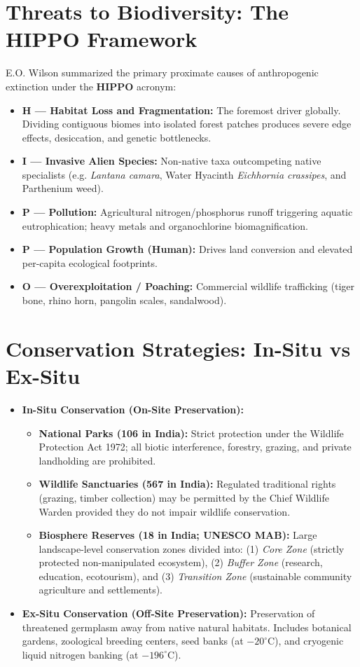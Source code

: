 \section{Threats to Biodiversity: The HIPPO Framework}
E.O. Wilson summarized the primary proximate causes of anthropogenic extinction under the \textbf{HIPPO} acronym:
\begin{itemize}[leftmargin=1.5em]
    \item \textbf{H --- Habitat Loss and Fragmentation:} The foremost driver globally. Dividing contiguous biomes into isolated forest patches produces severe edge effects, desiccation, and genetic bottlenecks.
    \item \textbf{I --- Invasive Alien Species:} Non-native taxa outcompeting native specialists (e.g. \textit{Lantana camara}, Water Hyacinth \textit{Eichhornia crassipes}, and Parthenium weed).
    \item \textbf{P --- Pollution:} Agricultural nitrogen/phosphorus runoff triggering aquatic eutrophication; heavy metals and organochlorine biomagnification.
    \item \textbf{P --- Population Growth (Human):} Drives land conversion and elevated per-capita ecological footprints.
    \item \textbf{O --- Overexploitation / Poaching:} Commercial wildlife trafficking (tiger bone, rhino horn, pangolin scales, sandalwood).
\end{itemize}

\section{Conservation Strategies: In-Situ vs Ex-Situ}
\begin{itemize}[leftmargin=1.5em]
    \item \textbf{In-Situ Conservation (On-Site Preservation):}
    \begin{itemize}
        \item \textbf{National Parks (106 in India):} Strict protection under the Wildlife Protection Act 1972; all biotic interference, forestry, grazing, and private landholding are prohibited.
        \item \textbf{Wildlife Sanctuaries (567 in India):} Regulated traditional rights (grazing, timber collection) may be permitted by the Chief Wildlife Warden provided they do not impair wildlife conservation.
        \item \textbf{Biosphere Reserves (18 in India; UNESCO MAB):} Large landscape-level conservation zones divided into:
        (1) \textit{Core Zone} (strictly protected non-manipulated ecosystem),
        (2) \textit{Buffer Zone} (research, education, ecotourism), and
        (3) \textit{Transition Zone} (sustainable community agriculture and settlements).
    \end{itemize}
    \item \textbf{Ex-Situ Conservation (Off-Site Preservation):} Preservation of threatened germplasm away from native natural habitats. Includes botanical gardens, zoological breeding centers, seed banks (at $-20^\circ\text{C}$), and cryogenic liquid nitrogen banking (at $-196^\circ\text{C}$).
\end{itemize}

